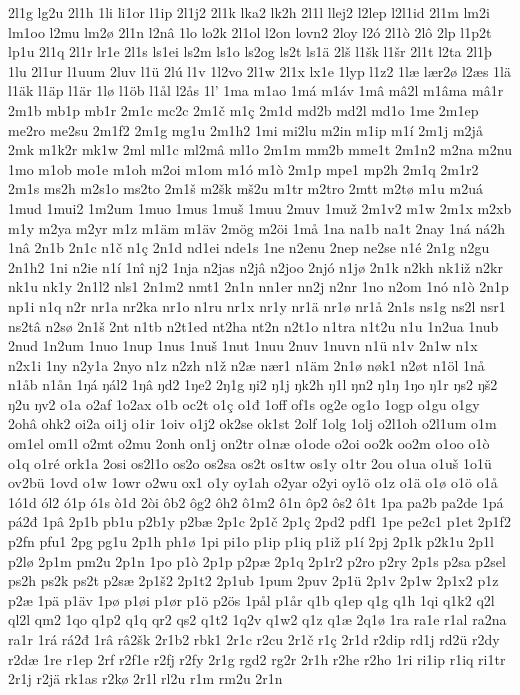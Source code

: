 2l1g
lg2u
2l1h
1li
li1or
l1ip
2l1j2
2l1k
lka2
lk2h
2l1l
llej2
l2lep
l2l1id
2l1m
lm2i
lm1oo
l2mu
lm2ø
2l1n
l2nâ
1lo
lo2k
2l1ol
l2on
lovn2
2loy
l2ó
2l1ò
2lô
2lp
l1p2t
lp1u
2l1q
2l1r
lr1e
2l1s
ls1ei
ls2m
ls1o
ls2og
ls2t
ls1ä
2lš
l1šk
l1šr
2l1t
l2ta
2l1þ
1lu
2l1ur
l1uum
2luv
l1ü
2lú
l1v
1l2vo
2l1w
2l1x
lx1e
1lyp
l1z2
1læ
lær2ø
l2æs
1lä
l1äk
l1äp
l1är
1lø
l1öb
l1ål
l2ås
1l'
1ma
m1ao
1má
m1áv
1mâ
mâ2l
m1âma
mâ1r
2m1b
mb1p
mb1r
2m1c
mc2c
2m1č
m1ç
2m1d
md2b
md2l
md1o
1me
2m1ep
me2ro
me2su
2m1f2
2m1g
mg1u
2m1h2
1mi
mi2lu
m2in
m1ip
m1í
2m1j
m2jå
2mk
m1k2r
mk1w
2ml
ml1c
ml2mâ
ml1o
2m1m
mm2b
mme1t
2m1n2
m2na
m2nu
1mo
m1ob
mo1e
m1oh
m2oi
m1om
m1ó
m1ò
2m1p
mpe1
mp2h
2m1q
2m1r2
2m1s
ms2h
m2s1o
ms2to
2m1š
m2šk
mš2u
m1tr
m2tro
2mtt
m2tø
m1u
m2uá
1mud
1mui2
1m2um
1muo
1mus
1muš
1muu
2muv
1muž
2m1v2
m1w
2m1x
m2xb
m1y
m2ya
m2yr
m1z
m1äm
m1äv
2mög
m2öi
1må
1na
na1b
na1t
2nay
1ná
ná2h
1nâ
2n1b
2n1c
n1č
n1ç
2n1d
nd1ei
nde1s
1ne
n2enu
2nep
ne2se
n1é
2n1g
n2gu
2n1h2
1ni
n2ie
n1í
1nî
nj2
1nja
n2jas
n2jâ
n2joo
2njó
n1jø
2n1k
n2kh
nk1iž
n2kr
nk1u
nk1y
2n1l2
nls1
2n1m2
nmt1
2n1n
nn1er
nn2j
n2nr
1no
n2om
1nó
n1ò
2n1p
np1i
n1q
n2r
nr1a
nr2ka
nr1o
n1ru
nr1x
nr1y
nr1ä
nr1ø
nr1å
2n1s
ns1g
ns2l
nsr1
ns2tâ
n2sø
2n1š
2nt
n1tb
n2t1ed
nt2ha
nt2n
n2t1o
n1tra
n1t2u
n1u
1n2ua
1nub
2nud
1n2um
1nuo
1nup
1nus
1nuš
1nut
1nuu
2nuv
1nuvn
n1ü
n1v
2n1w
n1x
n2x1i
1ny
n2y1a
2nyo
n1z
n2zh
n1ž
n2æ
nær1
n1äm
2n1ø
nøk1
n2øt
n1öl
1nå
n1åb
n1ån
1ŋá
ŋál2
1ŋâ
ŋd2
1ŋe2
2ŋ1g
ŋi2
ŋ1j
ŋk2h
ŋ1l
ŋn2
ŋ1ŋ
1ŋo
ŋ1r
ŋs2
ŋš2
ŋ2u
ŋv2
o1a
o2af
1o2ax
o1b
oc2t
o1ç
o1đ
1off
of1s
og2e
og1o
1ogp
o1gu
o1gy
2ohâ
ohk2
oi2a
oi1j
o1ir
1oiv
o1j2
ok2se
ok1st
2olf
1olg
1olj
o2l1oh
o2l1um
o1m
om1el
om1l
o2mt
o2mu
2onh
on1j
on2tr
o1næ
o1ode
o2oi
oo2k
oo2m
o1oo
o1ò
o1q
o1ré
ork1a
2osi
os2l1o
os2o
os2sa
os2t
os1tw
os1y
o1tr
2ou
o1ua
o1uš
1o1ü
ov2bü
1ovd
o1w
1owr
o2wu
ox1
o1y
oy1ah
o2yar
o2yi
oy1ö
o1z
o1ä
o1ø
o1ö
o1å
1ó1d
ól2
ó1p
ó1s
ò1d
2òi
ôb2
ôg2
ôh2
ô1m2
ô1n
ôp2
ôs2
ô1t
1pa
pa2b
pa2de
1pá
pá2đ
1pâ
2p1b
pb1u
p2b1y
p2bæ
2p1c
2p1č
2p1ç
2pd2
pdf1
1pe
pe2c1
p1et
2p1f2
p2fn
pfu1
2pg
pg1u
2p1h
ph1ø
1pi
pi1o
p1ip
p1iq
p1iž
p1í
2pj
2p1k
p2k1u
2p1l
p2lø
2p1m
pm2u
2p1n
1po
p1ò
2p1p
p2pæ
2p1q
2p1r2
p2ro
p2ry
2p1s
p2sa
p2sel
ps2h
ps2k
ps2t
p2sæ
2p1š2
2p1t2
2p1ub
1pum
2puv
2p1ü
2p1v
2p1w
2p1x2
p1z
p2æ
1pä
p1äv
1pø
p1øi
p1ør
p1ö
p2ös
1pål
p1år
q1b
q1ep
q1g
q1h
1qi
q1k2
q2l
ql2l
qm2
1qo
q1p2
q1q
qr2
qs2
q1t2
1q2v
q1w2
q1z
q1æ
2q1ø
1ra
ra1e
r1al
ra2na
ra1r
1rá
rá2đ
1râ
râ2šk
2r1b2
rbk1
2r1c
r2cu
2r1č
r1ç
2r1d
r2dip
rd1j
rd2ü
r2dy
r2dæ
1re
r1ep
2rf
r2f1e
r2fj
r2fy
2r1g
rgd2
rg2r
2r1h
r2he
r2ho
1ri
ri1ip
r1iq
ri1tr
2r1j
r2jä
rk1as
r2kø
2r1l
rl2u
r1m
rm2u
2r1n
